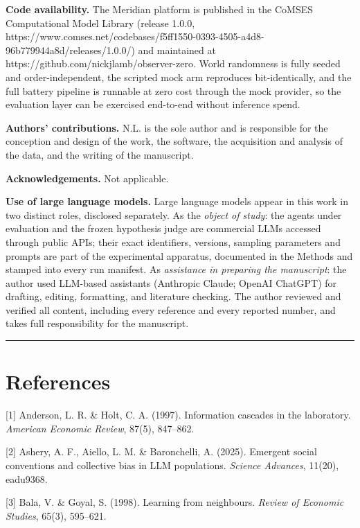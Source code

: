 \documentclass[pdflatex,sn-basic]{sn-jnl}
\begin{document}
\textbf{Code availability.} The Meridian platform is published in the CoMSES Computational Model
Library (release 1.0.0,
https://www.comses.net/codebases/f5ff1550-0393-4505-a4d8-96b779944a8d/releases/1.0.0/) and
maintained at https://github.com/nickjlamb/observer-zero. World randomness is fully seeded and
order-independent, the scripted mock arm reproduces bit-identically, and the full battery
pipeline is runnable at zero cost through the mock provider, so the evaluation layer can be
exercised end-to-end without inference spend.

\textbf{Authors' contributions.} N.L. is the sole author and is responsible for the conception and
design of the work, the software, the acquisition and analysis of the data, and the writing of
the manuscript.

\textbf{Acknowledgements.} Not applicable.

\textbf{Use of large language models.} Large language models appear in this work in two distinct
roles, disclosed separately. As the \emph{object of study}: the agents under evaluation and the
frozen hypothesis judge are commercial LLMs accessed through public APIs; their exact
identifiers, versions, sampling parameters and prompts are part of the experimental apparatus,
documented in the Methods and stamped into every run manifest. As \emph{assistance in preparing the
manuscript}: the author used LLM-based assistants (Anthropic Claude; OpenAI ChatGPT) for
drafting, editing, formatting, and literature checking. The author reviewed and verified all
content, including every reference and every reported number, and takes full responsibility
for the manuscript.

\begin{center}\rule{0.5\linewidth}{0.5pt}\end{center}


\section*{References}
\begingroup\small
{[}1{]} Anderson, L. R. \& Holt, C. A. (1997). Information cascades in the laboratory. \emph{American Economic Review}, 87(5), 847--862.

{[}2{]} Ashery, A. F., Aiello, L. M. \& Baronchelli, A. (2025). Emergent social conventions and collective bias in LLM populations. \emph{Science Advances}, 11(20), eadu9368.

{[}3{]} Bala, V. \& Goyal, S. (1998). Learning from neighbours. \emph{Review of Economic Studies}, 65(3), 595--621.
\end{document}
